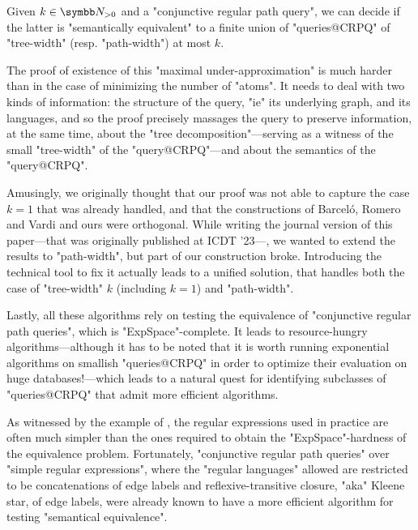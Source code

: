 \begin{contribution}
	Given $k\in \Np$ and a "conjunctive regular path query",
	we can decide if the latter is "semantically equivalent"
	to a finite union of "queries@CRPQ" of "tree-width"
	(resp. "path-width") at most $k$.
\end{contribution}

The proof of existence of this "maximal under-approximation" is
much harder than in the case of minimizing
the number of "atoms". It needs to deal with two kinds of information:
the structure of the query, "ie" its underlying graph, and its languages,
and so the proof precisely massages the query to
preserve information, at the same time, about the "tree decomposition"---serving as a
witness of the small "tree-width" of the "query@CRPQ"---and about the
semantics of the "query@CRPQ".

Amusingly, we originally thought that our proof was not able to
capture the case $k=1$ that was already handled, and that the constructions
of Barceló, Romero and Vardi and ours were orthogonal.
While writing the journal version of this paper---that was originally
published at ICDT '23---, we wanted to extend the results to "path-width",%
but part of our construction broke. Introducing the technical tool
to fix it%
actually leads to a unified solution, that handles both
the case of "tree-width" $k$ (including $k=1$) and "path-width".%

Lastly, all these algorithms rely on testing the equivalence
of "conjunctive regular path queries", which is "ExpSpace"-complete.
It leads to resource-hungry algorithms---although it has to be noted that it is
worth running exponential algorithms on smallish "queries@CRPQ" in order to optimize
their evaluation on huge databases!---which leads to a natural quest
for identifying subclasses of "queries@CRPQ" that admit more efficient algorithms.

As witnessed by the example of , the regular expressions
used in practice are often much simpler than the ones required
to obtain the "ExpSpace"-hardness of the equivalence problem.
Fortunately, "conjunctive regular path queries" over "simple regular expressions",
where the "regular languages" allowed are restricted to be concatenations of
edge labels and reflexive-transitive closure, "aka" Kleene star, of
edge labels, were already known to have a more efficient
algorithm for testing "semantical equivalence".

